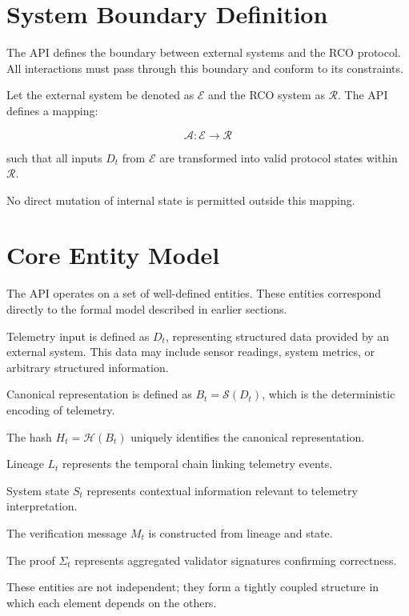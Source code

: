 \section{System Boundary Definition}

The API defines the boundary between external systems and the RCO protocol. All interactions must pass through this boundary and conform to its constraints.

Let the external system be denoted as $\mathcal{E}$ and the RCO system as $\mathcal{R}$. The API defines a mapping:

\begin{equation}
\mathcal{A} : \mathcal{E} \rightarrow \mathcal{R}
\end{equation}

such that all inputs $D_t$ from $\mathcal{E}$ are transformed into valid protocol states within $\mathcal{R}$.

No direct mutation of internal state is permitted outside this mapping.

\section{Core Entity Model}

The API operates on a set of well-defined entities. These entities correspond directly to the formal model described in earlier sections.

Telemetry input is defined as $D_t$, representing structured data provided by an external system. This data may include sensor readings, system metrics, or arbitrary structured information.

Canonical representation is defined as $B_t = \mathcal{S}(D_t)$, which is the deterministic encoding of telemetry.

The hash $H_t = \mathcal{H}(B_t)$ uniquely identifies the canonical representation.

Lineage $L_t$ represents the temporal chain linking telemetry events.

System state $S_t$ represents contextual information relevant to telemetry interpretation.

The verification message $M_t$ is constructed from lineage and state.

The proof $\Sigma_t$ represents aggregated validator signatures confirming correctness.

These entities are not independent; they form a tightly coupled structure in which each element depends on the others.

